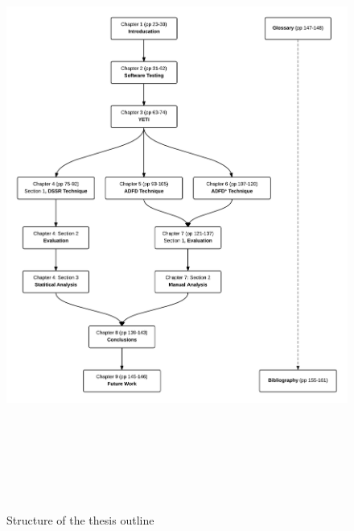 \begin{figure}[!H]
	\centering
		\includegraphics[width=16cm, height=20cm ]{chapter1/thesisOutline6.png}
		\bigskip
		\caption{Structure of the thesis outline}
	\label{fig:thesisOutline}
\end{figure}


